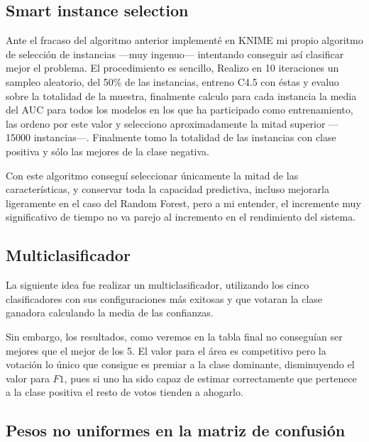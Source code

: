 \documentclass{article}
\newcommand{\img}[2]{
\noindent\makebox[\textwidth][c]{\texttt{[image: \#1]}}%
}
\begin{document}
\subsection{Smart instance selection}

\img{smart}{1}

Ante el fracaso del algoritmo anterior implementé en KNIME mi propio algoritmo de selección de instancias ---muy ingenuo--- intentando conseguir así clasificar mejor el problema. El procedimiento es sencillo, Realizo en 10 iteraciones un sampleo aleatorio, del 50\% de las instancias, entreno C4.5 con éstas y evaluo sobre la totalidad de la muestra, finalmente calculo para cada instancia la media del AUC para todos los modelos en los que ha participado como entrenamiento, las ordeno por este valor y selecciono aproximadamente la mitad superior ---15000 instancias---. Finalmente tomo la totalidad de las instancias con clase positiva y sólo las mejores de la clase negativa. 

\img{smart2}{0.5}

Con este algoritmo conseguí seleccionar únicamente la mitad de las características, y conservar toda la capacidad predictiva, incluso mejorarla ligeramente en el caso del Random Forest, pero a mi entender, el incremente muy significativo de tiempo no va parejo al incremento en el rendimiento del sistema.

\img{smart3}{1.2}

\subsection{Multiclasificador}

La siguiente idea fue realizar un multiclasificador, utilizando los cinco clasificadores con sus configuraciones más exitosas y que votaran la clase ganadora calculando la media de las confianzas.

\img{multi1}{0.5}

Sin embargo, los resultados, como veremos en la tabla final no conseguían ser mejores que el mejor de los 5. El valor para el área es competitivo pero la votación lo único que consigue es premiar a la clase dominante, disminuyendo el valor para $F1$, pues si uno ha sido capaz de estimar correctamente que pertenece a la clase positiva el resto de votos tienden a ahogarlo.

\subsection{Pesos no uniformes en la matriz de confusión}
\end{document}
